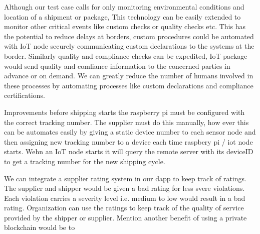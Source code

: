 Although our test case calls for only monitoring environmental conditions and location of a shipment or package, This technology can be easily extended to monitor other critical events like custom checks or quality checks etc. This has the potential to reduce delays at borders, custom procedures could be automated with IoT node securely communicating custom declarations to the systems at the border. Similarly quality and compliance checks can be expedited, IoT package would send quality and comliance information to the concerned parties in advance or on demand. We can greatly reduce the number of humans involved in these processes by automating
processes like custom declarations and compliance certifications.
   
Improvements 
before shipping starts the raspberry pi must be configured with the correct tracking number. The supplier must do this manually, how ever this can be automates easily by giving a static device number to each sensor node and then assigning new tracking number to a device each time raspbery pi / iot node starts. Wehn an IoT node starts it will query the remote server with its deviceID to get a tracking number for the new shipping cycle. 

We can integrate a supplier rating system in our dapp to keep track of ratings. The supplier and shipper would be given a bad rating for less svere violations. Each violation carries a severity level i.e. medium to low would result in a bad rating. Organization can use the ratings to keep track of the quality of service provided by the shipper or supplier. 
Mention another benefit of using a private blockchain would be to 
